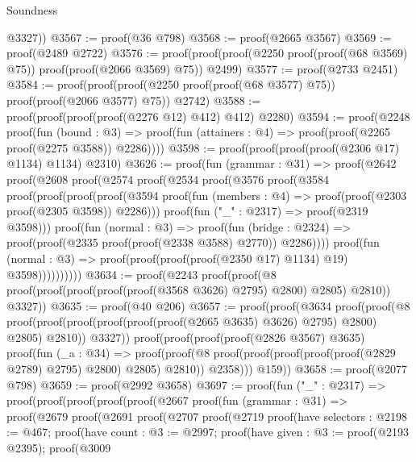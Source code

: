 \begin{lexlean}{Soundness}
\begin{coremodule}
          @3327))
@3567 := proof(@36 @798)
@3568 := proof(@2665 @3567)
@3569 := proof(@2489 @2722)
@3576 := proof(proof(proof(@2250 proof(proof(@68 @3569) @75)) proof(proof(@2066 @3569) @75)) @2499)
@3577 := proof(@2733 @2451)
@3584 := proof(proof(proof(@2250 proof(proof(@68 @3577) @75)) proof(proof(@2066 @3577) @75)) @2742)
@3588 := proof(proof(proof(proof(@2276 @12) @412) @412) @2280)
@3594 := proof(@2248
      proof(fun (bound : @3) =>
        proof(fun (attainers : @4) => proof(proof(@2265 proof(@2275 @3588)) @2286))))
@3598 := proof(proof(proof(proof(@2306 @17) @1134) @1134) @2310)
@3626 := proof(fun (grammar : @31) =>
    proof(@2642
        proof(@2608
            proof(@2574
                proof(@2534
                    proof(@3576
                        proof(@3584
                            proof(proof(proof(proof(@3594
                                      proof(fun (members : @4) =>
                                        proof(proof(@2303 proof(@2305 @3598)) @2286)))
                                    proof(fun ("_" : @2317) => proof(@2319 @3598)))
                                  proof(fun (normal : @3) =>
                                    proof(fun (bridge : @2324) =>
                                      proof(proof(@2335 proof(proof(@2338 @3588) @2770)) @2286))))
                                proof(fun (normal : @3) =>
                                  proof(proof(proof(proof(@2350 @17) @1134) @19) @3598))))))))))
@3634 := proof(@2243
      proof(proof(@8 proof(proof(proof(proof(proof(@3568 @3626) @2795) @2800) @2805) @2810)) @3327))
@3635 := proof(@40 @206)
@3657 := proof(proof(@3634
        proof(proof(@8
              proof(proof(proof(proof(proof(proof(@2665 @3635) @3626) @2795) @2800) @2805) @2810))
            @3327))
      proof(proof(proof(proof(@2826 @3567) @3635)
            proof(fun (_a : @34) =>
              proof(proof(@8 proof(proof(proof(proof(proof(@2829 @2789) @2795) @2800) @2805) @2810))
                  @2358)))
          @159))
@3658 := proof(@2077 @798)
@3659 := proof(@2992 @3658)
@3697 := proof(fun ("_" : @2317) =>
    proof(proof(proof(proof(proof(@2667
                proof(fun (grammar : @31) =>
                  proof(@2679
                      proof(@2691
                          proof(@2707
                              proof(@2719
                                  proof(have selectors : @2198 := @467;
                                    proof(have count : @3 := @2997;
                                      proof(have given : @3 := proof(@2193 @2395);
                                        proof(@3009

\end{coremodule}
\end{lexlean}
